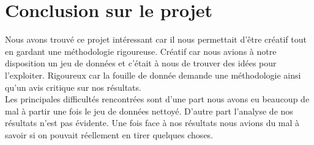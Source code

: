 \section{Conclusion sur le projet}
Nous avons trouvé ce projet intéressant car il nous permettait d'être créatif tout en gardant une méthodologie rigoureuse. Créatif car nous avions à notre disposition un jeu de données et c'était à nous de trouver des idées pour l'exploiter. Rigoureux car la fouille de donnée demande une méthodologie ainsi qu'un avis critique sur nos résultats.\\
Les principales difficultés rencontrées sont d'une part nous avons eu beaucoup de mal à partir une fois le jeu de données nettoyé. D'autre part l'analyse de nos résultats n'est pas évidente. Une fois face à nos résultats nous avions du mal à savoir si on pouvait réellement en tirer quelques choses.\\

